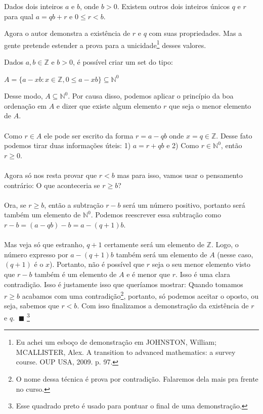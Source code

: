 \documentclass[main.tex]{subfiles}
\begin{document}
\begin{fact}
Dados dois inteiros $a$ e $b$, onde $b > 0$. Existem outros dois inteiros únicos $q$ e $r$ para qual $a = qb + r$ e $0 \leq r < b$.
\end{fact}

Agora o autor demonstra a existência de $r$ e $q$ com suas propriedades. Mas a gente pretende estender a prova para a unicidade\footnote{Eu achei um esboço de demonstração em JOHNSTON, William; MCALLISTER, Alex. A transition to advanced mathematics: a survey course. OUP USA, 2009. p. 97.} desses valores.

\begin{demonstration}
Dados $a,b \in \mathbb{Z}$ e $b > 0$, é possível criar um set do tipo:
\begin{center}
	$ A = \{ a - xb : x \in \mathbb{Z}, 0 \leq a - xb \} \subseteq \mathbb{N}^0 $
\end{center}
Desse modo, $A \subseteq \mathbb{N}^0$. Por causa disso, podemos aplicar o princípio da boa ordenação em $A$ e dizer que existe algum elemento $r$ que seja o menor elemento de $A$.
\\~\\
Como $r \in A$ ele pode ser escrito da forma $r = a - qb$ onde $x = q \in \mathbb{Z}$. Desse fato podemos tirar duas informações úteis: 1) $a = r + qb$ e 2) Como $r \in \mathbb{N}^0$, então $r \geq 0$.
\\~\\
Agora só nos resta provar que $r < b$ mas para isso, vamos usar o pensamento contrário: O que aconteceria se $r \geq b$?
\\~\\
Ora, se $r \geq b$, então a subtração $r - b$ será um número positivo, portanto será também um elemento de $\mathbb{N}^0$. Podemos reescrever essa subtração como $r - b = (a - qb) - b = a - (q + 1)b$. 
\\~\\
Mas veja só que estranho, $q + 1$ certamente será um elemento de $\mathbb{Z}$. Logo, o número expresso por $a - (q + 1)b$ também será um elemento de $A$ (nesse caso, $(q + 1)$ é o $x$). Portanto, não é possível que $r$ seja o seu menor elemento visto que $r - b$ também é um elemento de $A$ e é menor que $r$. Isso é uma clara contradição. Isso é justamente isso que queríamos mostrar: Quando tomamos $r \geq b$ acabamos com uma contradição\footnote{O nome dessa técnica é prova por contradição. Falaremos dela mais pra frente no curso.}, portanto, só podemos aceitar o oposto, ou seja, sabemos que $r < b$. Com isso finalizamos a demonstração da existência de $r$ e $q$. $\ \blacksquare$ \footnote{Esse quadrado preto é usado para pontuar o final de uma demonstração.}
\end{demonstration}
\end{document}
